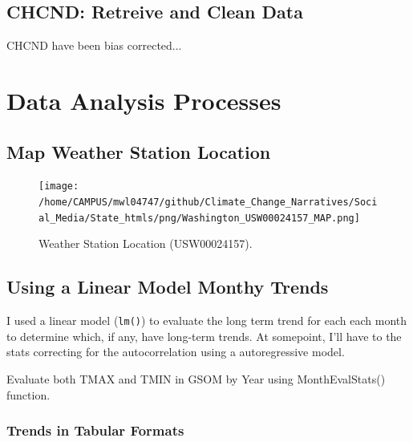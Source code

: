 \documentclass{article}
\begin{document}
\subsection{CHCND: Retreive and Clean Data}

CHCND have been bias corrected...


\section{Data Analysis Processes}

\subsection{Map Weather Station Location}






\begin{figure}
\texttt{[image: /home/CAMPUS/mwl04747/github/Climate\_Change\_Narratives/Social\_Media/State\_htmls/png/Washington\_USW00024157\_MAP.png]}
\caption{Weather Station Location (USW00024157). }
\label{fig:Map}
\end{figure}

\subsection{Using a Linear Model Monthy Trends}

I used a linear model (\texttt{lm()}) to evaluate the long term trend for each each month to determine which, if any, have long-term trends. At somepoint, I'll have to the stats correcting for the autocorrelation using a autoregressive model.  



Evaluate both TMAX and TMIN in GSOM by Year using MonthEvalStats() function. 

\begin{knitrout}
\color{fgcolor}\begin{kframe}


{\ttfamily\noindent\bfseries\color{errorcolor}{\#\# Error in is.data.frame(data): object 'GSOM' not found}}\end{kframe}
\end{knitrout}


\subsubsection{Trends in Tabular Formats}
\end{document}
